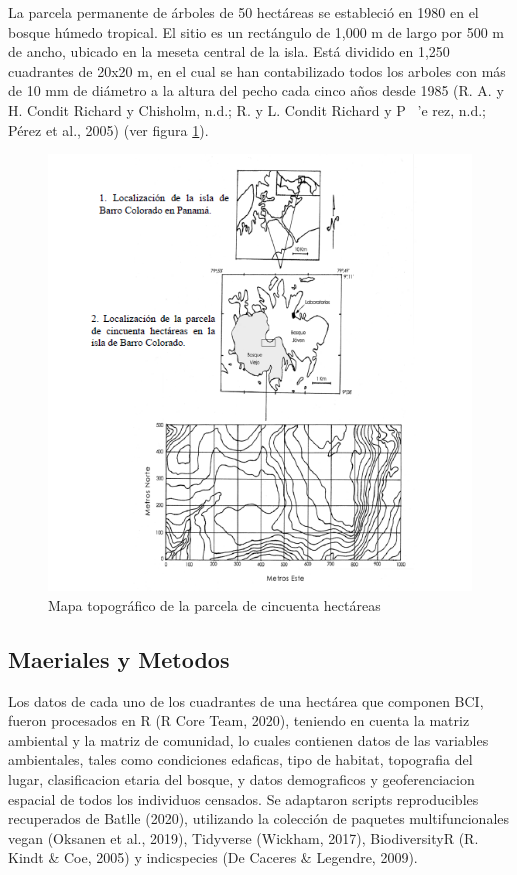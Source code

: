 \documentclass[11pt,]{article}
\begin{document}
La parcela permanente de árboles de 50 hectáreas se estableció en 1980
en el bosque húmedo tropical. El sitio es un rectángulo de 1,000 m de
largo por 500 m de ancho, ubicado en la meseta central de la isla. Está
dividido en 1,250 cuadrantes de 20x20 m, en el cual se han contabilizado
todos los arboles con más de 10 mm de diámetro a la altura del pecho
cada cinco años desde 1985 (R. A. y H. Condit Richard y Chisholm, n.d.;
R. y L. Condit Richard y P ~'e rez, n.d.; Pérez et al., 2005) (ver
figura \ref{fig:mapabarro}).

\begin{figure}
\centering
\includegraphics[width=1.00000\textwidth]{mapa Barro Colorado.png}
\caption{Mapa topográfico de la parcela de cincuenta hectáreas
\label{fig:mapabarro}}
\end{figure}

\subsection{Maeriales y Metodos}\label{maeriales-y-metodos}

Los datos de cada uno de los cuadrantes de una hectárea que componen
BCI, fueron procesados en R (R Core Team, 2020), teniendo en cuenta la
matriz ambiental y la matriz de comunidad, lo cuales contienen datos de
las variables ambientales, tales como condiciones edaficas, tipo de
habitat, topografia del lugar, clasificacion etaria del bosque, y datos
demograficos y geoferenciacion espacial de todos los individuos
censados. Se adaptaron scripts reproducibles recuperados de Batlle
(2020), utilizando la colección de paquetes multifuncionales vegan
(Oksanen et al., 2019), Tidyverse (Wickham, 2017), BiodiversityR (R.
Kindt \& Coe, 2005) y indicspecies (De Caceres \& Legendre, 2009).
\end{document}

